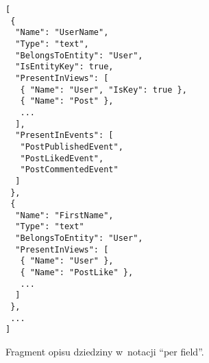 \begin{figure}[!ht]
\begin{verbatim}
[
 {
  "Name": "UserName",
  "Type": "text",
  "BelongsToEntity": "User",
  "IsEntityKey": true,
  "PresentInViews": [
   { "Name": "User", "IsKey": true },
   { "Name": "Post" },
   ...
  ],
  "PresentInEvents": [
   "PostPublishedEvent",
   "PostLikedEvent",
   "PostCommentedEvent"
  ]
 },
 {
  "Name": "FirstName",
  "Type": "text"
  "BelongsToEntity": "User",
  "PresentInViews": [
   { "Name": "User" },
   { "Name": "PostLike" },
   ...
  ]
 },
 ...
]
\end{verbatim}
\caption{Fragment opisu dziedziny w~notacji ``per field''.}
\label{fig:single:model_perField}
\end{figure}
